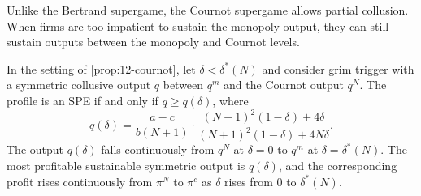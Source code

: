 Unlike the Bertrand supergame, the Cournot supergame allows partial collusion. When firms are too impatient to
sustain the monopoly output, they can still sustain outputs between the monopoly and Cournot levels.

\begin{proposition}\label{prop:12-partial-cournot}
In the setting of \cref{prop:12-cournot}, let $\delta < \delta^*(N)$ and consider grim trigger with a symmetric
collusive output $q$ between $q^m$ and the Cournot output $q^N$. The profile is an SPE if and only if
$q \ge q(\delta)$, where
\begin{equation}\label{eq:12-partial-q}
q(\delta) = \frac{a - c}{b(N + 1)}\cdot\frac{(N + 1)^2(1 - \delta) + 4\delta}{(N + 1)^2(1 - \delta) + 4N\delta} .
\end{equation}
The output $q(\delta)$ falls continuously from $q^N$ at $\delta = 0$ to $q^m$ at $\delta = \delta^*(N)$. The most
profitable sustainable symmetric output is $q(\delta)$, and the corresponding profit rises continuously from $\pi^N$
to $\pi^c$ as $\delta$ rises from $0$ to $\delta^*(N)$.
\end{proposition}

